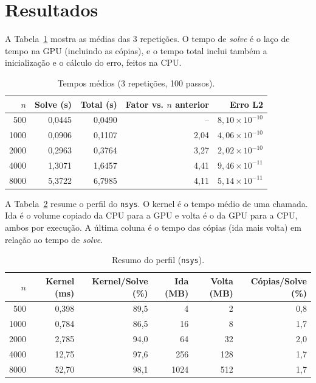 \documentclass[a4paper,12pt]{article}
\begin{document}
\section{Resultados}

A Tabela~\ref{tab:tempos} mostra as médias das 3 repetições. O tempo de
\textit{solve} é o laço de tempo na GPU (incluindo as cópias), e o tempo total
inclui também a inicialização e o cálculo do erro, feitos na CPU.

\begin{table}[h!]
\centering
\caption{Tempos médios (3 repetições, 100 passos).}
\label{tab:tempos}
\begin{tabular}{rrrrr}
\toprule
$n$ & Solve (s) & Total (s) & Fator vs. $n$ anterior & Erro L2 \\
\midrule
500  & 0,0445 & 0,0490 & --   & $8{,}10\times10^{-10}$ \\
1000 & 0,0906 & 0,1107 & 2,04 & $4{,}06\times10^{-10}$ \\
2000 & 0,2963 & 0,3764 & 3,27 & $2{,}02\times10^{-10}$ \\
4000 & 1,3071 & 1,6457 & 4,41 & $9{,}46\times10^{-11}$ \\
8000 & 5,3722 & 6,7985 & 4,11 & $5{,}14\times10^{-11}$ \\
\bottomrule
\end{tabular}
\end{table}

A Tabela~\ref{tab:perfil} resume o perfil do \texttt{nsys}. O kernel é o tempo
médio de uma chamada. Ida é o volume copiado da CPU para a GPU e volta é o da
GPU para a CPU, ambos por execução. A última coluna é o tempo das cópias (ida
mais volta) em relação ao tempo de \textit{solve}.

\begin{table}[h!]
\centering
\caption{Resumo do perfil (\texttt{nsys}).}
\label{tab:perfil}
\small
\begin{tabular}{rrrrrr}
\toprule
$n$ & Kernel (ms) & Kernel/Solve (\%) & Ida (MB) & Volta (MB) & Cópias/Solve (\%) \\
\midrule
500  & 0,398  & 89,5 & 4    & 2   & 0,8 \\
1000 & 0,784  & 86,5 & 16   & 8   & 1,7 \\
2000 & 2,785  & 94,0 & 64   & 32  & 2,0 \\
4000 & 12,75  & 97,6 & 256  & 128 & 1,7 \\
8000 & 52,70  & 98,1 & 1024 & 512 & 1,7 \\
\bottomrule
\end{tabular}
\end{table}
\end{document}
